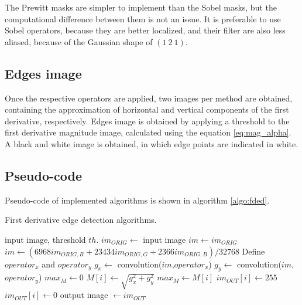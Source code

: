 \documentclass{ipol}
\numberwithin{equation}{section}
\numberwithin{table}{section}
\numberwithin{figure}{section}
\begin{document}
The Prewitt masks are simpler to implement than the Sobel masks, but the computational difference
between them is not an issue. It is preferable to use Sobel operators, because they are better localized, 
and their filter are also less aliased, because of the Gaussian shape of $(1\ 2\ 1)$.



\subsection{Edges image}

Once the respective operators are applied, two images per method are obtained, containing the approximation of horizontal
and vertical components of the first derivative, respectively. Edges image is obtained by applying a 
threshold to the first derivative magnitude image, calculated using the equation \ref{eq:mag_alpha}. 
A black and white image is obtained, in which edge points are indicated in white.


\subsection{Pseudo-code}

Pseudo-code of implemented algorithms is shown in algorithm \ref{algo:fded}. \\

\begin{algorithm}
\caption{First derivative edge detection algorithms.}
\label{algo:fded}
\begin{algorithmic}[1]
\REQUIRE input image, threshold $th$.
\STATE $im_{ORIG} \leftarrow$ input image
	\STATE $im \leftarrow im_{ORIG}$
\ELSE 
	\STATE $im \leftarrow (6968im_{ORIG,R}+23434im_{ORIG,G}+2366im_{ORIG,B})/32768$ 
\ENDIF
\STATE Define $operator_x$ and $operator_y$ 
\STATE $g_x \leftarrow$ convolution($im$,$operator_x$)
\STATE $g_y \leftarrow$ convolution($im$,$operator_y$)
\STATE $max_M \leftarrow 0$
	\STATE $M[i] \leftarrow \sqrt{g_x^2+g_y^2}$
		\STATE $max_M \leftarrow M[i]$
	\ENDIF
\ENDFOR
{}
		\STATE $im_{OUT}[i] \leftarrow 255$
	\ELSE
		\STATE $im_{OUT}[i] \leftarrow 0$
	\ENDIF
\ENDFOR
\RETURN output image $\leftarrow im_{OUT}$
\end{algorithmic}
\end{algorithm}
\end{document}
